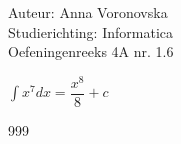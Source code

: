 \documentclass[a4paper]{article}
\begin{document}
\noindent \large Auteur: Anna Voronovska \\
\noindent \large Studierichting: Informatica \\
\noindent \large Oefeningenreeks 4A nr. 1.6 \\

\medskip 

\normalsize

 
$\displaystyle\int x^7 dx = \dfrac{x^8}{8} + c$

\begin{thebibliography}{999}
\end{thebibliography}
\end{document}
